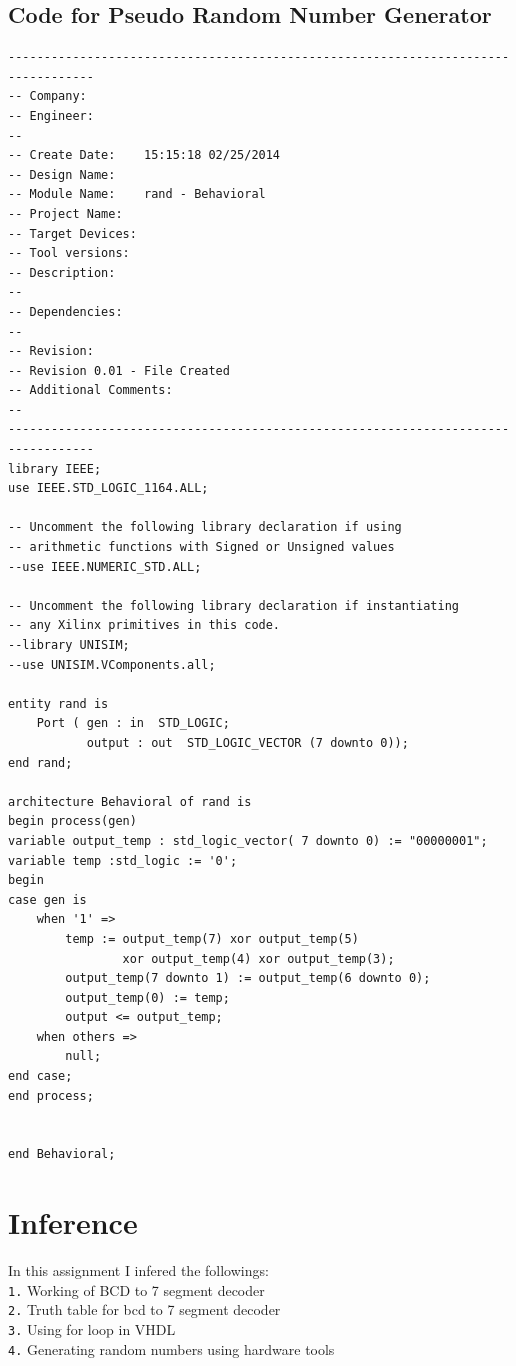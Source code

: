 \documentclass[12pt]{article}
\begin{document}
\subsection{Code for Pseudo Random Number Generator}
\begin{lstlisting}[style=vhdl]
----------------------------------------------------------------------------------
-- Company: 
-- Engineer: 
-- 
-- Create Date:    15:15:18 02/25/2014 
-- Design Name: 
-- Module Name:    rand - Behavioral 
-- Project Name: 
-- Target Devices: 
-- Tool versions: 
-- Description: 
--
-- Dependencies: 
--
-- Revision: 
-- Revision 0.01 - File Created
-- Additional Comments: 
--
----------------------------------------------------------------------------------
library IEEE;
use IEEE.STD_LOGIC_1164.ALL;

-- Uncomment the following library declaration if using
-- arithmetic functions with Signed or Unsigned values
--use IEEE.NUMERIC_STD.ALL;

-- Uncomment the following library declaration if instantiating
-- any Xilinx primitives in this code.
--library UNISIM;
--use UNISIM.VComponents.all;

entity rand is
    Port ( gen : in  STD_LOGIC;
           output : out  STD_LOGIC_VECTOR (7 downto 0));
end rand;

architecture Behavioral of rand is
begin process(gen)
variable output_temp : std_logic_vector( 7 downto 0) := "00000001";
variable temp :std_logic := '0';
begin
case gen is
	when '1' =>
		temp := output_temp(7) xor output_temp(5) 
				xor output_temp(4) xor output_temp(3);
		output_temp(7 downto 1) := output_temp(6 downto 0);
		output_temp(0) := temp;
		output <= output_temp;
	when others =>
		null;
end case;
end process;


end Behavioral;

\end{lstlisting}

\section{Inference}
In this assignment I infered the followings:\\
\verb|1.| Working of BCD to 7 segment decoder \\
\verb|2.| Truth table for bcd to 7 segment decoder \\
\verb|3.| Using for loop in VHDL \\
\verb|4.| Generating random numbers using hardware tools \\
\end{document}
